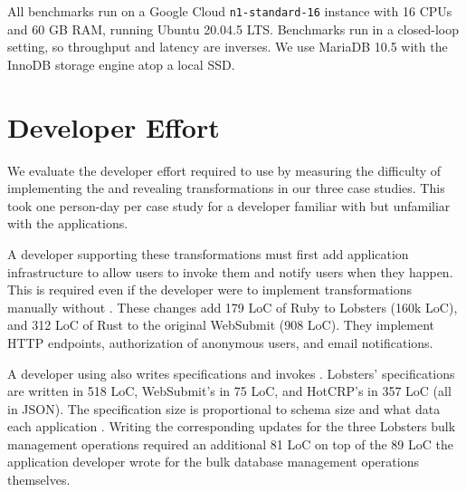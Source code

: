 All benchmarks run on a Google Cloud \texttt{n1-standard-16} instance with 16 CPUs
and 60 GB RAM, running Ubuntu 20.04.5 LTS. Benchmarks run in
a closed-loop setting, so throughput and latency are inverses. %
%
We use MariaDB 10.5 with the InnoDB storage engine atop a local SSD.
%

\section{\sys Developer Effort}
\label{s:eval-effort}


%
We evaluate the developer effort required to use \sys by measuring the
difficulty of implementing the \xxing and revealing transformations in our three
case studies.  This took one person-day per case study for a developer
familiar with \sys but unfamiliar with the applications.

A developer supporting these transformations must first add application
infrastructure to allow users to invoke them and notify users when they happen.
This is required even if the developer were to implement transformations
manually without \sys.
%
These changes add 179 LoC of Ruby to Lobsters (160k LoC), and 312 LoC of Rust
to the original WebSubmit (908 LoC). They implement HTTP endpoints,
authorization of anonymous users, and email notifications.
%

%
A developer using \sys also writes \xx specifications and invokes \sys.
Lobsters' \xx specifications are written in 518 LoC, WebSubmit's in 75 LoC, and
HotCRP's in 357 LoC (all in JSON).  The specification size is proportional to
schema size and what data each application \xxs.
%
Writing the corresponding updates for the three Lobsters bulk management
operations required an additional 81 LoC on top of the 89 LoC the application
developer wrote for the bulk database management operations themselves.
%

